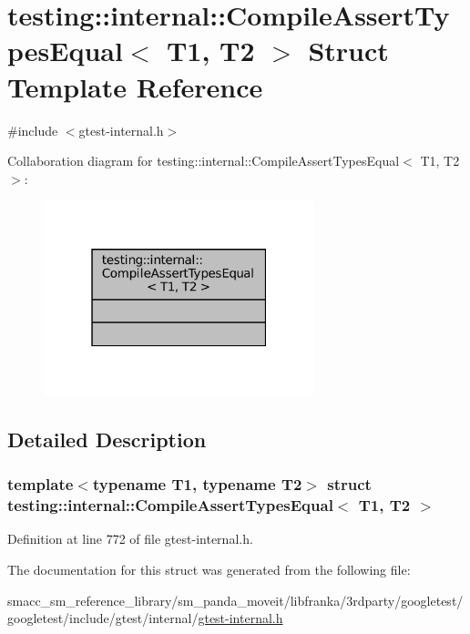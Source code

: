 \hypertarget{structtesting_1_1internal_1_1CompileAssertTypesEqual}{}\section{testing\+:\+:internal\+:\+:Compile\+Assert\+Types\+Equal$<$ T1, T2 $>$ Struct Template Reference}
\label{structtesting_1_1internal_1_1CompileAssertTypesEqual}


{\ttfamily \#include $<$gtest-\/internal.\+h$>$}



Collaboration diagram for testing\+:\+:internal\+:\+:Compile\+Assert\+Types\+Equal$<$ T1, T2 $>$\+:
\nopagebreak
\begin{figure}[H]
\begin{center}
\leavevmode
\includegraphics[width=223pt]{structtesting_1_1internal_1_1CompileAssertTypesEqual__coll__graph}
\end{center}
\end{figure}


\subsection{Detailed Description}
\subsubsection*{template$<$typename T1, typename T2$>$\newline
struct testing\+::internal\+::\+Compile\+Assert\+Types\+Equal$<$ T1, T2 $>$}



Definition at line 772 of file gtest-\/internal.\+h.



The documentation for this struct was generated from the following file\+:\begin{DoxyCompactItemize}
\item 
smacc\+\_\+sm\+\_\+reference\+\_\+library/sm\+\_\+panda\+\_\+moveit/libfranka/3rdparty/googletest/googletest/include/gtest/internal/\hyperlink{gtest-internal_8h}{gtest-\/internal.\+h}\end{DoxyCompactItemize}
